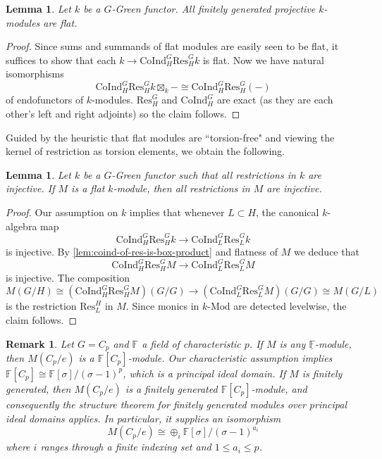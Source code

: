 \documentclass[11pt,dvipsnames]{amsart}
\newcommand{\F}{\mathbb{F}}
\newtheorem{lemma}[theorem]{Lemma}
\theoremstyle{BoldRemark}
\newtheorem{remark}[theorem]{Remark}
\newcommand{\Res}{\mathrm{Res}}
\newcommand{\Coind}{\mathrm{CoInd}}
\newcommand{\Mod}{\mathrm{Mod}}
\begin{document}
\begin{lemma}\label{lem:free-k-modules-are-flat}
    Let $k$ be a $G$-Green functor. All finitely generated projective $k$-modules are flat.
\end{lemma}

\begin{proof}
    Since sums and summands of flat modules are easily seen to be flat, it suffices to show that each $k \rightarrow \Coind_H^G \Res_H^G k$ is flat. Now we have natural isomorphisms 
    \[ 
        \Coind_H^G \Res_H^G k \boxtimes_k - \cong \Coind_H^G \Res_H^G (-) 
    \] 
    of endofunctors of $k$-modules. $\Res_H^G$ and $\Coind_H^G$ are exact (as they are each other's left and right adjoints) so the claim follows.
\end{proof}

Guided by the heuristic that flat modules are ``torsion-free" and viewing the kernel of restriction as torsion elements, we obtain the following.

\begin{lemma}\label{lem:flat-over-MRC-implies-MRC}
    Let $k$ be a $G$-Green functor such that all restrictions in $k$ are injective. If $M$ is a flat $k$-module, then all restrictions in $M$ are injective.
\end{lemma}

\begin{proof}
    Our assumption on $k$ implies that whenever $L \subset H$, the canonical $k$-algebra map 
    \[ 
        \Coind_H^G \Res_H^G k \rightarrow \Coind_L^G \Res_L^G k 
    \] 
    is injective. By \cref{lem:coind-of-res-is-box-product} and flatness of $M$ we deduce that 
    \[ 
        \Coind_H^G \Res_H^G M \rightarrow \Coind_L^G \Res_L^G M 
    \] 
    is injective. The composition 
    \[ 
        M(G/H) \cong (\Coind_H^G \Res_H^G M)(G/G) \rightarrow (\Coind_L^G \Res_L^G M)(G/G) \cong M(G/L) 
    \] 
    is the restriction $\Res_L^H$ in $M$. Since monics in $k \text{-} \Mod$ are detected levelwise, the claim follows.
\end{proof}

\begin{remark}\label{rem:bottom-level-of-modules-for-constant-F_p}
    Let $G = C_p$ and $\F$ a field of characteristic $p$. If $M$ is any $\underline{\F}$-module, then $M(C_p/e)$ is a $\F[C_p]$-module. Our characteristic assumption implies $\F[C_p] \cong \F[\sigma]/(\sigma-1)^p$, which is a principal ideal domain. If $M$ is finitely generated, then $M(C_p/e)$ is a finitely generated $\F[C_p]$-module, and consequently the structure theorem for finitely generated modules over principal ideal domains applies. In particular, it supplies an isomorphism
    \[ 
        M(C_p/e) \cong \oplus_i \F[\sigma]/(\sigma-1)^{a_i} 
    \] 
    where $i$ ranges through a finite indexing set and $1 \leq a_i \leq p$.
\end{remark}
\end{document}
